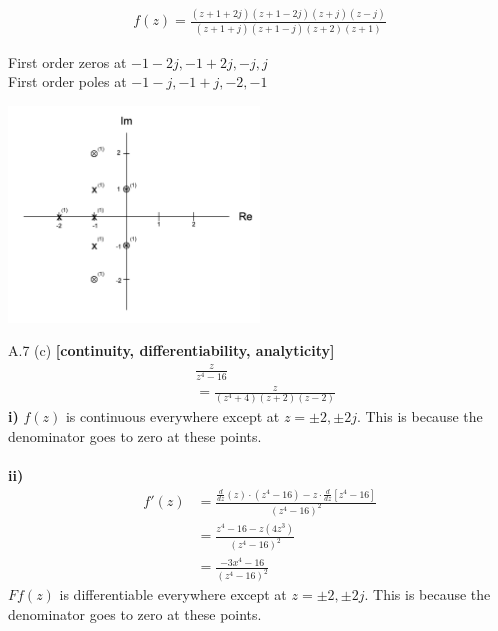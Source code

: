 \documentclass{article}
\begin{document}
\begin{equation*}
\begin{split}
    f(z) = \frac{(z + 1 + 2j)(z + 1 - 2j)(z+j)(z-j)}{(z + 1 + j)(z + 1 - j)(z + 2)(z + 1)}
\end{split}
\end{equation*}

First order zeros at $-1-2j, -1+2j, -j, j$\\
First order poles at $-1-j, -1+j, -2, -1$\\

\begin{center}
    \includegraphics[width=0.5\textwidth]{a6c.png}
\end{center}

A.7 (c) {\bf [continuity, differentiability, analyticity]}\\

\begin{equation*}
\begin{split}
    &\frac{z}{z^4-16}\\
    &= \frac{z}{(z^4 + 4)(z + 2)(z - 2)}
\end{split}
\end{equation*}
{\bf i)} $f(z)$ is continuous everywhere except at $z = \pm 2, \pm 2j$. This is because the denominator goes to zero at these points.\\\\
{\bf ii)} 
\begin{equation*}
\begin{split}
    f'(z) &= \frac{\frac{d}{dz}(z) \cdot (z^4 - 16) - z \cdot \frac{d}{dz}[z^4 - 16]}{(z^4 -16)^2}\\
    &= \frac{z^4 - 16 - z(4z^3)}{(z^4 - 16)^2}\\
    &= \frac{-3x^4 - 16}{(z^4 - 16)^2}
\end{split}
\end{equation*}
$Ff(z)$ is differentiable everywhere except at $z = \pm2, \pm2j$. This is because the denominator goes to zero at these points.\\\\
\end{document}
